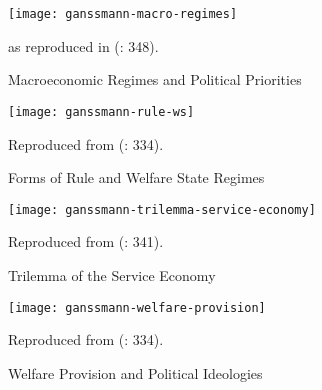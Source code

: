 
 \begin{figure}[htbp]
	\centering
	\texttt{[image: ganssmann-macro-regimes]}  
	\caption{Macroeconomic Regimes and Political Priorities}
	\label{fig:ganssmann-macro-regimes}
	\begin{flushleft}
		\scriptsize{\cite{Rodrik2002} as reproduced in \citeauthor{Ganssmann2010} (\citeyear{Ganssmann2010}: 348).}
	\end{flushleft}
\end{figure} 

\begin{figure}[htbp]
	\centering
	\texttt{[image: ganssmann-rule-ws]}  
	\caption{Forms of Rule and Welfare State Regimes}
	\label{fig:ganssmann-rule-ws}
	\begin{flushleft}
		\scriptsize{Reproduced from \citeauthor{Ganssmann2010} (\citeyear{Ganssmann2010}: 334).}
	\end{flushleft}
\end{figure} 

\begin{figure}[htbp]
	\centering
	\texttt{[image: ganssmann-trilemma-service-economy]}  
	\caption{Trilemma of the Service Economy}
	\label{fig:ganssmann-trilemma-service-economy}
	\begin{flushleft}
		\scriptsize{Reproduced from \citeauthor{Ganssmann2010} (\citeyear{Ganssmann2010}: 341).}
	\end{flushleft}
\end{figure}

\begin{figure}[htbp]
	\centering
	\texttt{[image: ganssmann-welfare-provision]}  
	\caption{Welfare Provision and Political Ideologies}
	\label{fig:ganssmann-welfare-provision}
	\begin{flushleft}
		\scriptsize{Reproduced from \citeauthor{Ganssmann2010} (\citeyear{Ganssmann2010}: 334).}
	\end{flushleft}
\end{figure}





